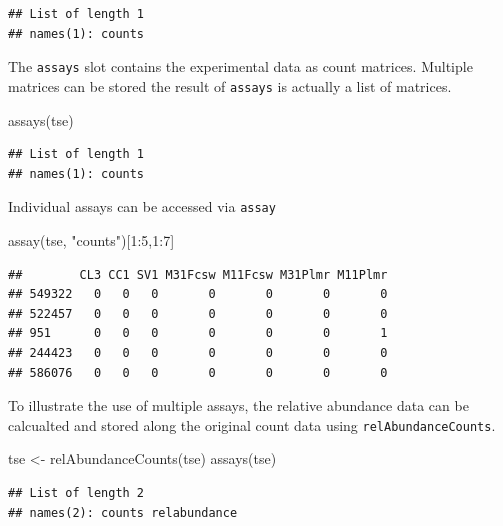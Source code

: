 \documentclass[
]{book}
\newenvironment{Shaded}{\begin{snugshade}}{\end{snugshade}}
\newcommand{\DecValTok}[1]{\textcolor[rgb]{0.00,0.00,0.81}{#1}}
\newcommand{\FunctionTok}[1]{\textcolor[rgb]{0.00,0.00,0.00}{#1}}
\newcommand{\NormalTok}[1]{#1}
\newcommand{\OtherTok}[1]{\textcolor[rgb]{0.56,0.35,0.01}{#1}}
\newcommand{\SpecialCharTok}[1]{\textcolor[rgb]{0.00,0.00,0.00}{#1}}
\newcommand{\StringTok}[1]{\textcolor[rgb]{0.31,0.60,0.02}{#1}}
\begin{document}
\begin{verbatim}
## List of length 1
## names(1): counts
\end{verbatim}

The \texttt{assays} slot contains the experimental data as count matrices. Multiple
matrices can be stored the result of \texttt{assays} is actually a list of matrices.

\begin{Shaded}
\begin{Highlighting}[]
\FunctionTok{assays}\NormalTok{(tse)}
\end{Highlighting}
\end{Shaded}

\begin{verbatim}
## List of length 1
## names(1): counts
\end{verbatim}

Individual assays can be accessed via \texttt{assay}

\begin{Shaded}
\begin{Highlighting}[]
\FunctionTok{assay}\NormalTok{(tse, }\StringTok{"counts"}\NormalTok{)[}\DecValTok{1}\SpecialCharTok{:}\DecValTok{5}\NormalTok{,}\DecValTok{1}\SpecialCharTok{:}\DecValTok{7}\NormalTok{]}
\end{Highlighting}
\end{Shaded}

\begin{verbatim}
##        CL3 CC1 SV1 M31Fcsw M11Fcsw M31Plmr M11Plmr
## 549322   0   0   0       0       0       0       0
## 522457   0   0   0       0       0       0       0
## 951      0   0   0       0       0       0       1
## 244423   0   0   0       0       0       0       0
## 586076   0   0   0       0       0       0       0
\end{verbatim}

To illustrate the use of multiple assays, the relative abundance data can be
calcualted and stored along the original count data using \texttt{relAbundanceCounts}.

\begin{Shaded}
\begin{Highlighting}[]
\NormalTok{tse }\OtherTok{\textless{}{-}} \FunctionTok{relAbundanceCounts}\NormalTok{(tse)}
\FunctionTok{assays}\NormalTok{(tse)}
\end{Highlighting}
\end{Shaded}

\begin{verbatim}
## List of length 2
## names(2): counts relabundance
\end{verbatim}
\end{document}
